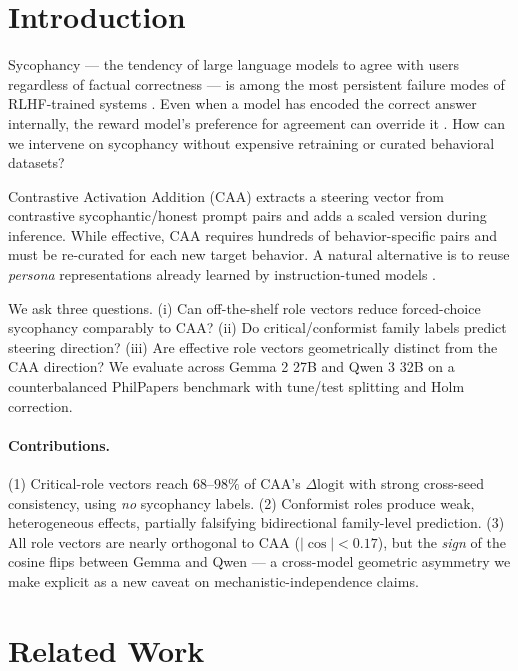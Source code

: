 \documentclass{article}
\theoremstyle{plain}
\theoremstyle{definition}
\theoremstyle{remark}
\begin{document}
\section{Introduction}

Sycophancy --- the tendency of large language models to agree with users regardless of factual correctness --- is among the most persistent failure modes of RLHF-trained systems \cite{perez2022,sharma2023}. Even when a model has encoded the correct answer internally, the reward model's preference for agreement can override it \cite{wang2025a}. How can we intervene on sycophancy without expensive retraining or curated behavioral datasets?

Contrastive Activation Addition (CAA) \cite{rimsky2024,turner2023} extracts a steering vector from contrastive sycophantic/honest prompt pairs and adds a scaled version during inference. While effective, CAA requires hundreds of behavior-specific pairs and must be re-curated for each new target behavior. A natural alternative is to reuse \emph{persona} representations already learned by instruction-tuned models \cite{lu2026}.

We ask three questions. (i) Can off-the-shelf role vectors reduce forced-choice sycophancy comparably to CAA? (ii) Do critical/conformist family labels predict steering direction? (iii) Are effective role vectors geometrically distinct from the CAA direction? We evaluate across Gemma 2 27B \cite{gemma2024} and Qwen 3 32B \cite{qwen2025} on a counterbalanced PhilPapers benchmark with tune/test splitting and Holm correction.

\paragraph{Contributions.} (1) Critical-role vectors reach $68$--$98\%$ of CAA's $\Delta\mathrm{logit}$ with strong cross-seed consistency, using \emph{no} sycophancy labels. (2) Conformist roles produce weak, heterogeneous effects, partially falsifying bidirectional family-level prediction. (3) All role vectors are nearly orthogonal to CAA ($|\cos|<0.17$), but the \emph{sign} of the cosine flips between Gemma and Qwen --- a cross-model geometric asymmetry we make explicit as a new caveat on mechanistic-independence claims.

\section{Related Work}
\end{document}
